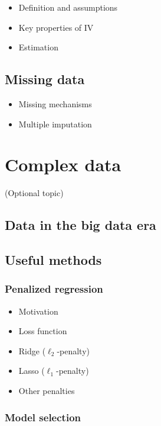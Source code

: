 \documentclass[12pt,]{book}
\providecommand{\tightlist}{%
  \setlength{\itemsep}{0pt}\setlength{\parskip}{0pt}}
\begin{document}
\begin{itemize}
\tightlist
\item
  Definition and assumptions
\item
  Key properties of IV
\item
  Estimation
\end{itemize}

\section{Missing data}\label{missing-data}

\begin{itemize}
\tightlist
\item
  Missing mechanisms
\item
  Multiple imputation
\end{itemize}

\chapter{Complex data}\label{ch:dim}

(Optional topic)

\section{Data in the big data era}\label{data-in-the-big-data-era}

\section{Useful methods}\label{useful-methods}

\subsection{Penalized regression}\label{penalized-regression}

\begin{itemize}
\tightlist
\item
  Motivation
\item
  Loss function
\item
  Ridge (\(\ell_2\)-penalty)
\item
  Lasso (\(\ell_1\)-penalty)
\item
  Other penalties
\end{itemize}

\subsection{Model selection}\label{model-selection}
\end{document}
